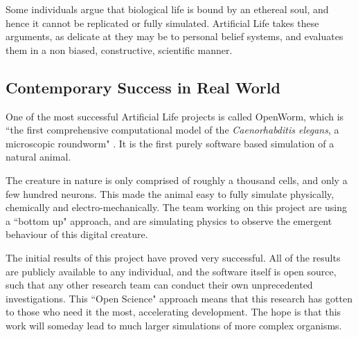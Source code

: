 \documentclass[10pt,a4paper]{article}
\begin{document}
				Some individuals argue that biological life is bound by an ethereal
				soul, and hence it cannot be replicated or fully simulated. Artificial
				Life takes these arguments, as delicate at they may be to personal
				belief systems, and evaluates them in a non biased, constructive,
				scientific manner.

			\subsection{Contemporary Success in Real World}

				One of the most successful Artificial Life projects is called OpenWorm,
				which is ``the first comprehensive computational model of the
				\textsl{Caenorhabditis elegans}, a microscopic roundworm"
				\cite{openworm}. It is the first purely software based simulation of a
				natural animal.

				The creature in nature is only comprised of roughly a thousand cells,
				and only a few hundred neurons. This made the animal easy to fully
				simulate physically, chemically and electro-mechanically. The team
				working on this project are using a ``bottom up" approach, and are
				simulating physics to observe the emergent behaviour of this digital
				creature.

				The initial results of this project have proved very successful. All of
				the results are publicly available to any individual, and the software
				itself is open source, such that any other research team can conduct
				their own unprecedented investigations. This ``Open Science" approach
				means that this research has gotten to those who need it the most,
				accelerating development. The hope is that this work will someday lead
				to much larger simulations of more complex organisms.

		\pagebreak \printbibliography
\end{document}
